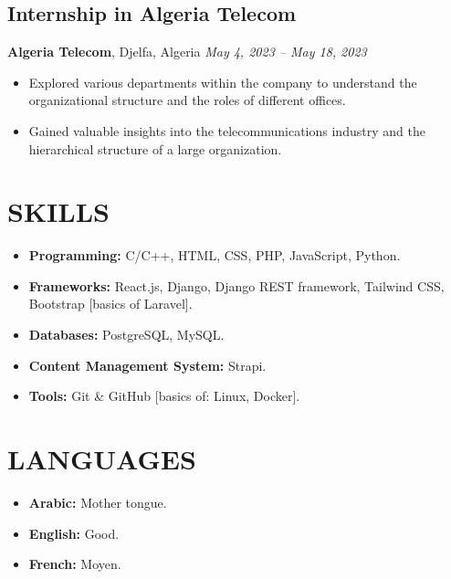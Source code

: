 \documentclass[a4paper,12pt]{article}
\begin{document}
\subsection*{Internship in Algeria Telecom}
\textbf{Algeria Telecom}, Djelfa, Algeria \hfil
\textit{May 4, 2023 – May 18, 2023} \\
\begin{itemize}
    \item Explored various departments within the company to understand the organizational structure and the roles of different offices.
    \item Gained valuable insights into the telecommunications industry and the hierarchical structure of a large organization.
\end{itemize}

\section{SKILLS}
\begin{itemize}
    \itemsep=-.3em
    \item \textbf{Programming:} C/C++, HTML, CSS, PHP, JavaScript, Python.
    \item \textbf{Frameworks:} React.js, Django, Django REST framework, Tailwind CSS, Bootstrap [basics of Laravel].
    \item \textbf{Databases:} PostgreSQL, MySQL.
    \item \textbf{Content Management System:} Strapi.
    \item \textbf{Tools:} Git \& GitHub [basics of: Linux, Docker].
\end{itemize}

\section{LANGUAGES}
\begin{itemize}
    \itemsep=-.3em
    \item \textbf{Arabic:} Mother tongue.
    \item \textbf{English:} Good.
    \item \textbf{French:} Moyen.
\end{itemize}
\end{document}

